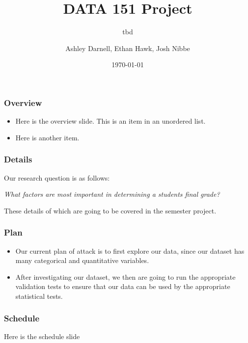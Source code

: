\documentclass{beamer}
\title{DATA 151 Project}
\subtitle{tbd}
\author{Ashley Darnell, Ethan Hawk, Josh Nibbe}
\institute{Valparaiso University}
\date{\today}
\begin{document}
\begin{frame}
\titlepage
\end{frame}


\begin{frame}
\frametitle{Overview}
  \begin{itemize}
    \item Here is the overview slide. This is an item in an unordered list.

    \item Here is another item.
  \end{itemize}
\end{frame}


\begin{frame}
\frametitle{Details}
Our research question is as follows:

  \begin{center}
    \textit{What factors are most important in determining a students final grade?}
  \end{center}


These details of which are going to be covered in the semester project.  
\end{frame}


\begin{frame}
\frametitle{Plan}
  \begin{itemize}
    \item Our current plan of attack is to first explore our data, since our dataset has many categorical and 
quantitative variables.

    \item After investigating our dataset, we then are going to run the appropriate validation tests to ensure that our data
can be used by the appropriate statistical tests.

  \end{itemize}
\end{frame}

\begin{frame}
\frametitle{Schedule}
Here is the schedule slide
\end{frame}
\end{document}
